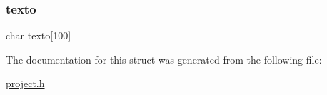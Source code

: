 \mbox{\label{structlrc_a0483fa55a1e6e8682a762fdb280d18d2}} 
\subsubsection{\texorpdfstring{texto}{texto}}
{\footnotesize\ttfamily char texto\mbox{[}100\mbox{]}}



The documentation for this struct was generated from the following file\+:\begin{DoxyCompactItemize}
\item 
\mbox{\hyperlink{project_8h}{project.\+h}}\end{DoxyCompactItemize}

